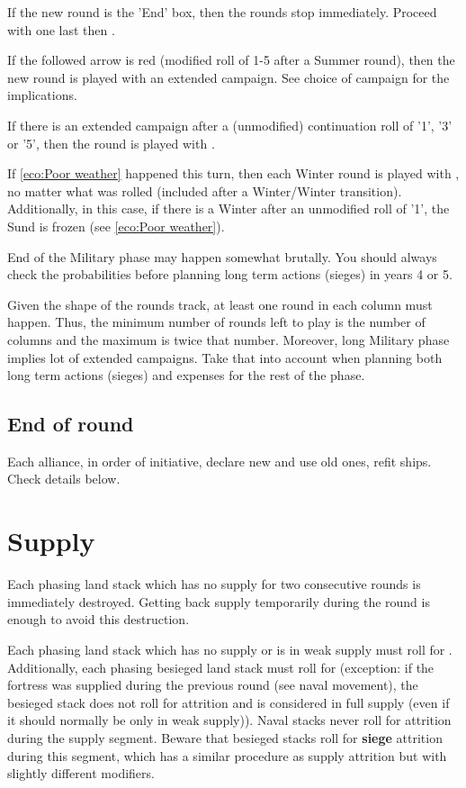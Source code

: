 If the new round is the 'End' box, then the rounds stop immediately. Proceed
with one last  then .

If the followed arrow is red (modified roll of 1-5 after a Summer round), then
the new round is played with an extended campaign. See choice of campaign for
the implications.

If there is an extended campaign after a (unmodified) continuation roll of
'1', '3' or '5', then the round is played with .

If \ref{eco:Poor weather} happened this turn, then each Winter round is played
with , no matter what was rolled (included after a
Winter/Winter transition). Additionally, in this case, if there is a Winter
after an unmodified roll of '1', the Sund is frozen (see \ref{eco:Poor
  weather}).

\begin{playtip}
  End of the Military phase may happen somewhat brutally. You should always
  check the probabilities before planning long term actions (sieges) in years
  4 or 5.

  Given the shape of the rounds track, at least one round in each column must
  happen. Thus, the minimum number of rounds left to play is the number of
  columns and the maximum is twice that number. Moreover, long Military phase
  implies lot of extended campaigns. Take that into account when planning both
  long term actions (sieges) and expenses for the rest of the phase.
\end{playtip}

\subsection{End of round}
Each alliance, in order of initiative, declare new 
and use old ones, refit  ships. Check details below.

\section{Supply}
\label{chMilitary:Supply}
Each phasing land stack which has no supply for two consecutive rounds is
immediately destroyed. Getting back supply temporarily during the round is
enough to avoid this destruction.

Each phasing land stack which has no supply or is in weak supply must roll for
. Additionally, each phasing besieged land stack must
roll for  (exception: if the fortress was supplied
during the previous round (see naval movement), the besieged stack does not
roll for attrition and is considered in full supply (even if it should
normally be only in weak supply)). Naval stacks never roll for attrition
during the supply segment. Beware that besieged stacks roll for \textbf{siege}
attrition during this segment, which has a similar procedure as supply
attrition but with slightly different modifiers.

